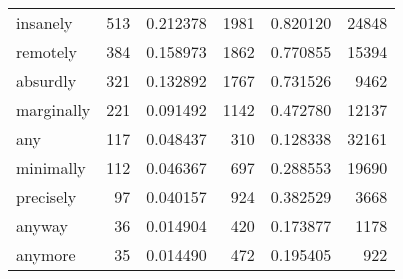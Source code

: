 \begin{table}[ht]
\begin{tabular}{lrrrrr}
insanely & {\cellcolor[HTML]{E4EEF5}} \color[HTML]{000000} 513 & {\cellcolor[HTML]{E4EEF5}} \color[HTML]{000000} 0.212378 & {\cellcolor[HTML]{E2EDF5}} \color[HTML]{000000} 1981 & {\cellcolor[HTML]{E2EDF5}} \color[HTML]{000000} 0.820120 & {\cellcolor[HTML]{F4FAFC}} \color[HTML]{000000} 24848 \\
remotely & {\cellcolor[HTML]{E9F2F7}} \color[HTML]{000000} 384 & {\cellcolor[HTML]{E9F2F7}} \color[HTML]{000000} 0.158973 & {\cellcolor[HTML]{E4EEF5}} \color[HTML]{000000} 1862 & {\cellcolor[HTML]{E4EEF5}} \color[HTML]{000000} 0.770855 & {\cellcolor[HTML]{F6FBFC}} \color[HTML]{000000} 15394 \\
absurdly & {\cellcolor[HTML]{EBF4F8}} \color[HTML]{000000} 321 & {\cellcolor[HTML]{EBF4F8}} \color[HTML]{000000} 0.132892 & {\cellcolor[HTML]{E5EFF6}} \color[HTML]{000000} 1767 & {\cellcolor[HTML]{E5EFF6}} \color[HTML]{000000} 0.731526 & {\cellcolor[HTML]{F6FBFD}} \color[HTML]{000000} 9462 \\
marginally & {\cellcolor[HTML]{F0F7FA}} \color[HTML]{000000} 221 & {\cellcolor[HTML]{F0F7FA}} \color[HTML]{000000} 0.091492 & {\cellcolor[HTML]{EDF5F9}} \color[HTML]{000000} 1142 & {\cellcolor[HTML]{EDF5F9}} \color[HTML]{000000} 0.472780 & {\cellcolor[HTML]{F6FBFD}} \color[HTML]{000000} 12137 \\
any & {\cellcolor[HTML]{F4FAFC}} \color[HTML]{000000} 117 & {\cellcolor[HTML]{F4FAFC}} \color[HTML]{000000} 0.048437 & {\cellcolor[HTML]{F7FCFD}} \color[HTML]{000000} 310 & {\cellcolor[HTML]{F7FCFD}} \color[HTML]{000000} 0.128338 & {\cellcolor[HTML]{F3F9FC}} \color[HTML]{000000} 32161 \\
minimally & {\cellcolor[HTML]{F4FAFC}} \color[HTML]{000000} 112 & {\cellcolor[HTML]{F4FAFC}} \color[HTML]{000000} 0.046367 & {\cellcolor[HTML]{F3F9FB}} \color[HTML]{000000} 697 & {\cellcolor[HTML]{F3F9FB}} \color[HTML]{000000} 0.288553 & {\cellcolor[HTML]{F5FAFC}} \color[HTML]{000000} 19690 \\
precisely & {\cellcolor[HTML]{F5FAFC}} \color[HTML]{000000} 97 & {\cellcolor[HTML]{F5FAFC}} \color[HTML]{000000} 0.040157 & {\cellcolor[HTML]{F0F7FA}} \color[HTML]{000000} 924 & {\cellcolor[HTML]{F0F7FA}} \color[HTML]{000000} 0.382529 & {\cellcolor[HTML]{F7FCFD}} \color[HTML]{000000} 3668 \\
anyway & {\cellcolor[HTML]{F7FCFD}} \color[HTML]{000000} 36 & {\cellcolor[HTML]{F7FCFD}} \color[HTML]{000000} 0.014904 & {\cellcolor[HTML]{F6FBFD}} \color[HTML]{000000} 420 & {\cellcolor[HTML]{F6FBFD}} \color[HTML]{000000} 0.173877 & {\cellcolor[HTML]{F7FCFD}} \color[HTML]{000000} 1178 \\
anymore & {\cellcolor[HTML]{F7FCFD}} \color[HTML]{000000} 35 & {\cellcolor[HTML]{F7FCFD}} \color[HTML]{000000} 0.014490 & {\cellcolor[HTML]{F6FBFC}} \color[HTML]{000000} 472 & {\cellcolor[HTML]{F6FBFC}} \color[HTML]{000000} 0.195405 & {\cellcolor[HTML]{F7FCFD}} \color[HTML]{000000} 922 \\
\bottomrule
\end{tabular}
\end{table}

